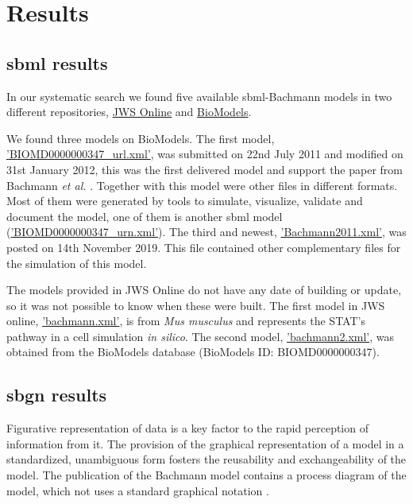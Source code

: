 \section*{Results} \label{sec:resuslt}
\subsection*{\acf{sbml} results}
In our systematic search we found five available \ac{sbml}-Bachmann models in two different repositories, \hyperlink{https://www.systemsmedicine.net/posts/jws-online-biological-systems-modelling}{JWS Online} and \hyperlink{https://www.ebi.ac.uk/biomodels/}{BioModels}.

We found three models on BioModels. The first model, \hyperlink{https://www.ebi.ac.uk/biomodels/model/download/BIOMD0000000347.2?filename=BIOMD0000000347_url.xml}{'BIOMD0000000347\_url.xml'}, was submitted on 22nd July 2011 and modified on 31st January 2012, this was the first delivered model and support the paper from Bachmann \textit{et al.} \cite{bachmannmodel}. Together with this model were other files in different formats. Most of them were generated by tools to simulate, visualize, validate and document the model, one of them is another \ac{sbml} model (\hyperlink{https://www.ebi.ac.uk/biomodels/model/download/BIOMD0000000347.2?filename=BIOMD0000000347_url.xml}{'BIOMD0000000347\_urn.xml'}). The third and newest, \hyperlink{https://www.ebi.ac.uk/biomodels/model/download/BIOMD0000000861.2?filename=Bachmann2011.xml}{'Bachmann2011.xml'}, was posted on 14th November 2019. This file contained other complementary files for the simulation of this model.  

The models provided in JWS Online do not have any date of building or update, so it was not possible to know when these were built. The first model in JWS online, \hyperlink{https://jjj.bio.vu.nl/models/bachmann/sbml/?download=1}{'bachmann.xml'}, is from \textit{Mus musculus} and represents the STAT's pathway in a cell simulation \textit{in silico}. The second model, \hyperlink{https://jjj.bio.vu.nl/models/bachmann2/sbml/?download=1}{'bachmann2.xml'}, was obtained from the BioModels database (BioModels ID: BIOMD0000000347).

\subsection*{\acf{sbgn} results}
Figurative representation of data is a key factor to the rapid perception of information from it. The provision of the graphical representation of a model in a standardized, unambiguous form fosters the reusability and exchangeability of the model. The publication of the Bachmann model contains a process diagram of the model, which not uses a standard graphical notation \cite{bachmannmodel}.

